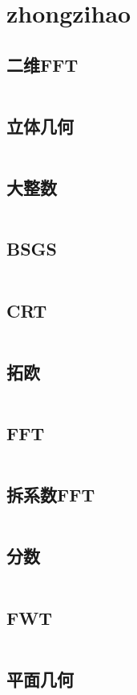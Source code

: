 \chapter{zhongzihao}
\section{二维FFT}
\inputminted{cpp}{\source/zhongzihao/2dfft.cpp}
\section{立体几何}
\inputminted{cpp}{\source/zhongzihao/3dgeometry.cpp}
\section{大整数}
\inputminted{cpp}{\source/zhongzihao/bignum.cpp}
\section{BSGS}
\inputminted{cpp}{\source/zhongzihao/bsgs.cpp}
\section{CRT}
\inputminted{cpp}{\source/zhongzihao/crt.cpp}
\section{拓欧}
\inputminted{cpp}{\source/zhongzihao/euclidinv.cpp}
\section{FFT}
\inputminted{cpp}{\source/zhongzihao/fft.cpp}
\section{拆系数FFT}
\inputminted{cpp}{\source/zhongzihao/fftcomb.cpp}
\section{分数}
\inputminted{cpp}{\source/zhongzihao/fraction.cpp}
\section{FWT}
\inputminted{cpp}{\source/zhongzihao/fwt.cpp}
\section{平面几何}
\inputminted{cpp}{\source/zhongzihao/geometry.cpp}
